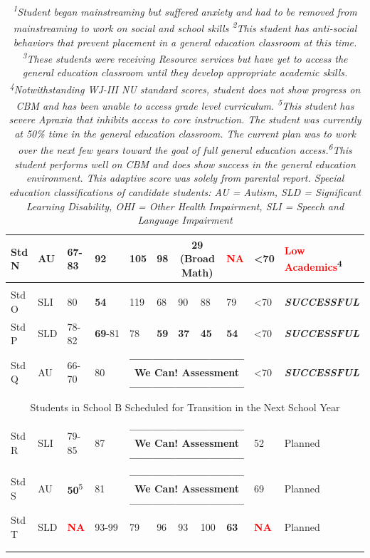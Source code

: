 \documentclass[twoside]{article}
\begin{document}
\begin{tiny}
\begin{landscape}
\begin{longtable}{p{1.5cm}p{1.5cm}p{1.5cm}p{1.5cm}p{1.75cm}p{1.75cm}p{1.75cm}p{1.75cm}p{1.75cm}p{1.75cm}p{2.5cm}@{}}
Std N & AU & 67-83 & 92 & 105 & 98 & \multicolumn{2}{c}{\textbf{29 (Broad Math)}} & \textcolor{red}{\textbf{NA}} & \textless70 & \textcolor{red}{Low Academics}\textsuperscript{4}\\
\hline\\
Std O & SLI & 80 & \textbf{54} & 119 & 68 & 90 & 88 & 79 & \textless70 & \textbf{\textit{SUCCESSFUL}}\\
Std P & SLD & 78-82 & \textbf{69}-81 & 78 & \textbf{59} & \textbf{37} & \textbf{45} & \textbf{54} & \textless70 & \textbf{\textit{SUCCESSFUL}}\\
Std Q & AU & 66-70 & 80 & \multicolumn{5}{c}{\textbf{------------------------------We Can! Assessment------------------------------}} & \textless70 & \textbf{\textit{SUCCESSFUL}}\\
\hline\\
\multicolumn{11}{c}{Students in School B Scheduled for Transition in the Next School Year}\\
\hline\\
Std R & SLI & 79-85 & 87 & \multicolumn{5}{c}{\textbf{------------------------------We Can! Assessment------------------------------}} & 52 & Planned\\
Std S & AU & \textbf{50}\textsuperscript{5} & 81 & \multicolumn{5}{c}{\textbf{------------------------------We Can! Assessment------------------------------}} & 69 & Planned\\
Std T & SLD & \textcolor{red}{\textbf{NA}} & 93-99 & 79 & 96 & 93 & 100 & \textbf{63} & \textcolor{red}{\textbf{NA}} & Planned\\
\hline\\
\caption*{\textit{\textsuperscript{1}Student began mainstreaming but suffered anxiety and had to be removed from mainstreaming to work on social and school skills \textsuperscript{2}This student has anti-social behaviors that prevent placement in a general education classroom at this time. \textsuperscript{3}These students were receiving Resource services but have yet to access the general education classroom until they develop appropriate academic skills. \textsuperscript{4}Notwithstanding WJ-III NU standard scores, student does not show progress on CBM and has been unable to access grade level curriculum. \textsuperscript{5}This student has severe Apraxia that inhibits access to core instruction. The student was currently at 50\% time in the general education classroom. The current plan was to work over the next few years toward the goal of full general education access.\textsuperscript{6}This student performs well on CBM and does show success in the general education environment. This adaptive score was solely from parental report. Special education classifications of candidate students: AU = Autism, SLD = Significant Learning Disability, OHI = Other Health Impairment, SLI = Speech and Language Impairment}}
\end{longtable}
\end{landscape}
\end{tiny}
\end{document}
